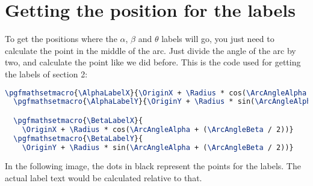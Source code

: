 \documentclass{amsart}
\begin{document}
\newpage

\section{Getting the position for the labels}

To get the positions where the $\alpha$, $\beta$ and $\theta$ labels will go,
you just need to calculate the point in the middle of the arc. Just divide the
angle of the arc by two, and calculate the point like we did before. This is the
code used for getting the labels of section 2:

\begin{lstlisting}[language=tex]
  \pgfmathsetmacro{\AlphaLabelX}{\OriginX + \Radius * cos(\ArcAngleAlpha / 2)}
  \pgfmathsetmacro{\AlphaLabelY}{\OriginY + \Radius * sin(\ArcAngleAlpha / 2)}

  \pgfmathsetmacro{\BetaLabelX}{
    \OriginX + \Radius * cos(\ArcAngleAlpha + (\ArcAngleBeta / 2))}
  \pgfmathsetmacro{\BetaLabelY}{
    \OriginY + \Radius * sin(\ArcAngleAlpha + (\ArcAngleBeta / 2))}
\end{lstlisting}

In the following image, the dots in black represent the points for the
labels. The actual label text would be calculated relative to that.
\end{document}
